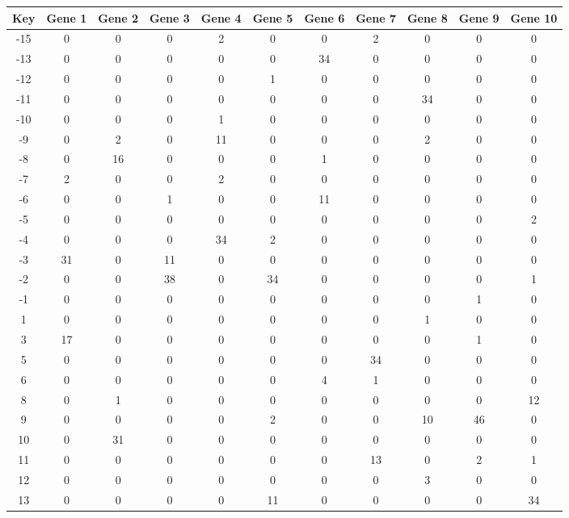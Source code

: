 \begin{tabular}{|c|c|c|c|c|c|c|c|c|c|c|}
\hline
Key & Gene 1 & Gene 2 & Gene 3 & Gene 4 & Gene 5 & Gene 6 & Gene 7 & Gene 8 & Gene 9 & Gene 10 \\
\hline
-15 & 0 & 0 & 0 & 2 & 0 & 0 & 2 & 0 & 0 & 0 \\
-13 & 0 & 0 & 0 & 0 & 0 & 34 & 0 & 0 & 0 & 0 \\
-12 & 0 & 0 & 0 & 0 & 1 & 0 & 0 & 0 & 0 & 0 \\
-11 & 0 & 0 & 0 & 0 & 0 & 0 & 0 & 34 & 0 & 0 \\
-10 & 0 & 0 & 0 & 1 & 0 & 0 & 0 & 0 & 0 & 0 \\
-9 & 0 & 2 & 0 & 11 & 0 & 0 & 0 & 2 & 0 & 0 \\
-8 & 0 & 16 & 0 & 0 & 0 & 1 & 0 & 0 & 0 & 0 \\
-7 & 2 & 0 & 0 & 2 & 0 & 0 & 0 & 0 & 0 & 0 \\
-6 & 0 & 0 & 1 & 0 & 0 & 11 & 0 & 0 & 0 & 0 \\
-5 & 0 & 0 & 0 & 0 & 0 & 0 & 0 & 0 & 0 & 2 \\
-4 & 0 & 0 & 0 & 34 & 2 & 0 & 0 & 0 & 0 & 0 \\
-3 & 31 & 0 & 11 & 0 & 0 & 0 & 0 & 0 & 0 & 0 \\
-2 & 0 & 0 & 38 & 0 & 34 & 0 & 0 & 0 & 0 & 1 \\
-1 & 0 & 0 & 0 & 0 & 0 & 0 & 0 & 0 & 1 & 0 \\
1 & 0 & 0 & 0 & 0 & 0 & 0 & 0 & 1 & 0 & 0 \\
3 & 17 & 0 & 0 & 0 & 0 & 0 & 0 & 0 & 1 & 0 \\
5 & 0 & 0 & 0 & 0 & 0 & 0 & 34 & 0 & 0 & 0 \\
6 & 0 & 0 & 0 & 0 & 0 & 4 & 1 & 0 & 0 & 0 \\
8 & 0 & 1 & 0 & 0 & 0 & 0 & 0 & 0 & 0 & 12 \\
9 & 0 & 0 & 0 & 0 & 2 & 0 & 0 & 10 & 46 & 0 \\
10 & 0 & 31 & 0 & 0 & 0 & 0 & 0 & 0 & 0 & 0 \\
11 & 0 & 0 & 0 & 0 & 0 & 0 & 13 & 0 & 2 & 1 \\
12 & 0 & 0 & 0 & 0 & 0 & 0 & 0 & 3 & 0 & 0 \\
13 & 0 & 0 & 0 & 0 & 11 & 0 & 0 & 0 & 0 & 34 \\
\hline
\end{tabular}